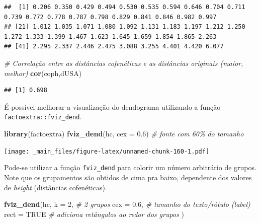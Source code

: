 \documentclass[
]{book}
\newenvironment{Shaded}{\begin{snugshade}}{\end{snugshade}}
\newcommand{\CommentTok}[1]{\textcolor[rgb]{0.56,0.35,0.01}{\textit{#1}}}
\newcommand{\DataTypeTok}[1]{\textcolor[rgb]{0.13,0.29,0.53}{#1}}
\newcommand{\DecValTok}[1]{\textcolor[rgb]{0.00,0.00,0.81}{#1}}
\newcommand{\FloatTok}[1]{\textcolor[rgb]{0.00,0.00,0.81}{#1}}
\newcommand{\KeywordTok}[1]{\textcolor[rgb]{0.13,0.29,0.53}{\textbf{#1}}}
\newcommand{\NormalTok}[1]{#1}
\newcommand{\OtherTok}[1]{\textcolor[rgb]{0.56,0.35,0.01}{#1}}
\theoremstyle{definition}
\theoremstyle{definition}
\theoremstyle{definition}
\theoremstyle{remark}
\begin{document}
\begin{verbatim}
##  [1] 0.206 0.350 0.429 0.494 0.530 0.535 0.594 0.646 0.704 0.711 0.739 0.772 0.778 0.787 0.798 0.829 0.841 0.846 0.982 0.997
## [21] 1.012 1.035 1.071 1.080 1.092 1.131 1.183 1.197 1.212 1.250 1.272 1.333 1.399 1.467 1.623 1.645 1.659 1.854 1.865 2.263
## [41] 2.295 2.337 2.446 2.475 3.088 3.255 4.401 4.420 6.077
\end{verbatim}

\begin{Shaded}
\begin{Highlighting}[]
\CommentTok{\# Correlação entre as distâncias cofenéticas e as distâncias originais (maior, melhor)}
\KeywordTok{cor}\NormalTok{(coph,dUSA)}
\end{Highlighting}
\end{Shaded}

\begin{verbatim}
## [1] 0.698
\end{verbatim}

É possível melhorar a visualização do dendograma utilizando a função \texttt{factoextra::fviz\_dend}.

\begin{Shaded}
\begin{Highlighting}[]
\KeywordTok{library}\NormalTok{(factoextra)}
\KeywordTok{fviz\_dend}\NormalTok{(hc, }\DataTypeTok{cex =} \FloatTok{0.6}\NormalTok{)  }\CommentTok{\# fonte com 60\% do tamanho}
\end{Highlighting}
\end{Shaded}

\texttt{[image: \_main\_files/figure-latex/unnamed-chunk-160-1.pdf]}

Pode-se utilizar a função \texttt{fviz\_dend} para colorir um número arbitrário de grupos. Note que os grupamentos são obtidos de cima pra baixo, dependente dos valores de \emph{height} (distâncias cofenéticas).

\begin{Shaded}
\begin{Highlighting}[]
\KeywordTok{fviz\_dend}\NormalTok{(hc, }\DataTypeTok{k =} \DecValTok{2}\NormalTok{,  }\CommentTok{\# 2 grupos}
          \DataTypeTok{cex =} \FloatTok{0.6}\NormalTok{,  }\CommentTok{\# tamanho do texto/rótulo (label)}
          \DataTypeTok{rect =} \OtherTok{TRUE} \CommentTok{\# adiciona retângulos ao redor dos grupos}
\NormalTok{)}
\end{Highlighting}
\end{Shaded}
\end{document}
